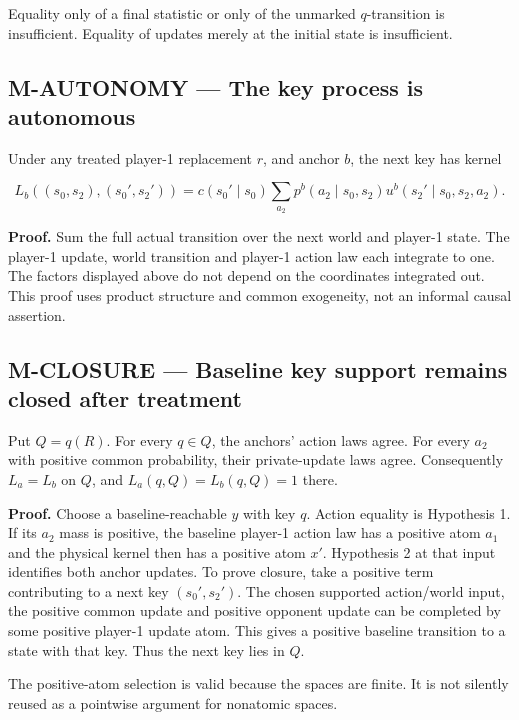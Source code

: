 \documentclass[
  11pt,
  a4paper,
]{article}
\begin{document}
Equality only of a final statistic or only of the unmarked
\(q\)-transition is insufficient. Equality of updates merely at the
initial state is insufficient.

\subsection{M-AUTONOMY --- The key process is
autonomous}\label{m-autonomy-the-key-process-is-autonomous}

Under any treated player-1 replacement \(r\), and anchor \(b\), the next
key has kernel

\[L_b((s_0,s_2),(s_0',s_2'))=
 c(s_0'\mid s_0)\sum_{a_2}p^b(a_2\mid s_0,s_2)
 u^b(s_2'\mid s_0,s_2,a_2).\]

\textbf{Proof.} Sum the full actual transition over the next world and
player-1 state. The player-1 update, world transition and player-1
action law each integrate to one. The factors displayed above do not
depend on the coordinates integrated out. This proof uses product
structure and common exogeneity, not an informal causal assertion.

\subsection{M-CLOSURE --- Baseline key support remains closed after
treatment}\label{m-closure-baseline-key-support-remains-closed-after-treatment}

Put \(Q=q(R)\). For every \(q\in Q\), the anchors' action laws agree.
For every \(a_2\) with positive common probability, their private-update
laws agree. Consequently \(L_a=L_b\) on \(Q\), and
\(L_a(q,Q)=L_b(q,Q)=1\) there.

\textbf{Proof.} Choose a baseline-reachable \(y\) with key \(q\). Action
equality is Hypothesis 1. If its \(a_2\) mass is positive, the baseline
player-1 action law has a positive atom \(a_1\) and the physical kernel
then has a positive atom \(x'\). Hypothesis 2 at that input identifies
both anchor updates. To prove closure, take a positive term contributing
to a next key \((s_0',s_2')\). The chosen supported action/world input,
the positive common update and positive opponent update can be completed
by some positive player-1 update atom. This gives a positive baseline
transition to a state with that key. Thus the next key lies in \(Q\).

The positive-atom selection is valid because the spaces are finite. It
is not silently reused as a pointwise argument for nonatomic spaces.
\end{document}
